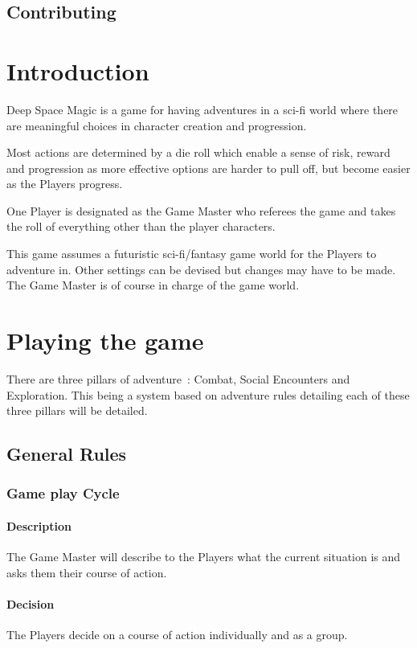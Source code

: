 \documentclass[a4paper,12pt,oneside]{book}
\begin{document}
    \section*{Contributing}

    \tableofcontents

    \mainmatter
    \chapter{Introduction}
        Deep Space Magic is a game for having adventures in a sci-fi world where there are meaningful choices in character creation and progression.
        
        Most actions are determined by a die roll which enable a sense of risk, reward and progression as more effective options are harder to pull off, but become easier as the Players progress.

        One Player is designated as the Game Master who referees the game and takes the roll of everything other than the player characters.

        This game assumes a futuristic sci-fi/fantasy game world for the Players to adventure in. Other settings can be devised but changes may have to be made. The Game Master is of course in charge of the game world.

    \chapter{Playing the game}
        There are three pillars of adventure~\cite{PlayersHandbook}: Combat, Social Encounters and Exploration. This being a system based on adventure rules detailing each of these three pillars will be detailed.
        \section{General Rules}
            \subsection{Game play Cycle}
                \subsubsection{Description}
                The Game Master will describe to the Players what the current situation is and asks them their course of action.

                \subsubsection{Decision}
                The Players decide on a course of action individually and as a group.
            
\end{document}
